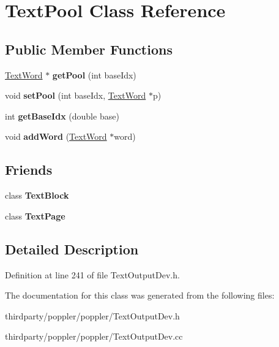 \hypertarget{class_text_pool}{}\section{Text\+Pool Class Reference}
\label{class_text_pool}
\subsection*{Public Member Functions}
\begin{DoxyCompactItemize}
\item 
\mbox{\label{class_text_pool_a87afb2c2f3f95ca124668c1266681dd5}} 
\hyperlink{class_text_word}{Text\+Word} $\ast$ {\bfseries get\+Pool} (int base\+Idx)
\item 
\mbox{\label{class_text_pool_a4032a52ba19540cf1341640e3803f35a}} 
void {\bfseries set\+Pool} (int base\+Idx, \hyperlink{class_text_word}{Text\+Word} $\ast$p)
\item 
\mbox{\label{class_text_pool_a1cee13c49b351eebb23fd419c43fb900}} 
int {\bfseries get\+Base\+Idx} (double base)
\item 
\mbox{\label{class_text_pool_ac165d66ada826ef0851a87a850645042}} 
void {\bfseries add\+Word} (\hyperlink{class_text_word}{Text\+Word} $\ast$word)
\end{DoxyCompactItemize}
\subsection*{Friends}
\begin{DoxyCompactItemize}
\item 
\mbox{\label{class_text_pool_a10941693a31766eabb041642470df529}} 
class {\bfseries Text\+Block}
\item 
\mbox{\label{class_text_pool_aabfaf949a35dc7fec076efc8f20054a8}} 
class {\bfseries Text\+Page}
\end{DoxyCompactItemize}


\subsection{Detailed Description}


Definition at line 241 of file Text\+Output\+Dev.\+h.



The documentation for this class was generated from the following files\+:\begin{DoxyCompactItemize}
\item 
thirdparty/poppler/poppler/Text\+Output\+Dev.\+h\item 
thirdparty/poppler/poppler/Text\+Output\+Dev.\+cc\end{DoxyCompactItemize}
